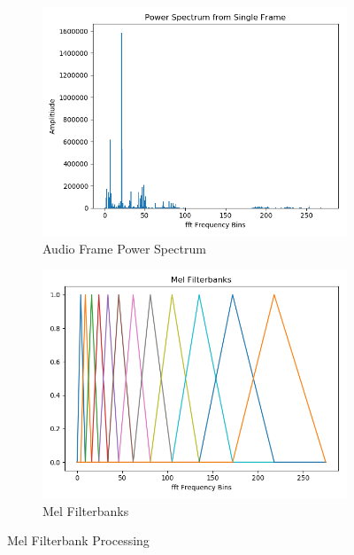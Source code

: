\begin{figure}[h!]
    \centering
    \begin{subfigure}[b]{0.49\textwidth}
        \includegraphics[width=\textwidth]{figures/mfcc/frame_power_spectrum.png}
        \caption{Audio Frame Power Spectrum}\label{fig:mfcc_power_spec}
    \end{subfigure}
    \begin{subfigure}[b]{0.49\textwidth}
        \includegraphics[width=\textwidth]{figures/mfcc/filterbanks.png}
        \caption{Mel Filterbanks}\label{fig:mfcc_mel_filterbanks}
    \end{subfigure}
    \caption{Mel Filterbank Processing}\label{fig:mfcc_filterbank_processing}
\end{figure}

